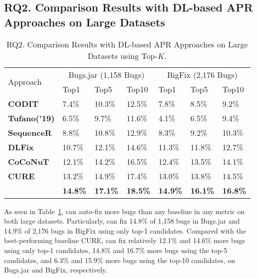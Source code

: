 \subsection{\bf RQ2. Comparison Results with DL-based APR Approaches on Large Datasets}

\begin{table}[t]
	\caption{RQ2. Comparison Results with DL-based APR Approaches on Large Datasets using Top-$K$.}
	\vspace{-10pt}
        {\small
	\begin{center}
		\renewcommand{\arraystretch}{1}
		\begin{tabular}{p{1.6cm}|p{0.7cm}|p{0.7cm}|p{0.7cm}|p{0.7cm}|p{0.7cm}|p{0.7cm}}\hline
			\multirow{2}{*}{Approach}&\multicolumn{3}{c|}{Bugs.jar (1,158 Bugs)}&\multicolumn{3}{c}{BigFix (2,176 Bugs)}\\\cline{2-7}
		                          & Top1   & Top5   & Top10  & Top1   & Top5   & Top10\\
			\hline
			\textbf{CODIT}        & 7.4\%  & 10.3\% & 12.5\% & 7.8\%  & 8.5\%  & 9.2\%\\
			\textbf{Tufano('19)}  & 6.5\%  & 9.7\%  & 11.6\% & 4.1\%  & 6.5\%  & 9.4\%\\
			\textbf{SequenceR}    & 8.8\%  & 10.8\% & 12.9\% & 8.3\%  & 9.2\%  & 10.3\%\\
			\textbf{DLFix}        & 10.7\% & 12.1\% & 14.6\% & 11.3\% & 11.8\% & 12.7\%\\
			\textbf{CoCoNuT}      & 12.1\% & 14.2\% & 16.5\% & 12.4\% & 13.5\% & 14.1\%\\
			\textbf{CURE}         & 13.2\% & 14.9\% & 17.4\% & 13.0\% & 13.8\% & 14.5\%\\
			\hline
			\textbf{\tool}        & \textbf{14.8\%} & \textbf{17.1\%} & \textbf{18.5\%} & \textbf{14.9\%} & \textbf{16.1\%} & \textbf{16.8\%}\\
			\hline
		\end{tabular}
		\label{RQ2_results}
	\end{center}
        }
\end{table}


As seen in Table~\ref{RQ2_results}, {\tool} can auto-fix more bugs
than any baseline in any metric on both large datasets.  Particularly,
{\tool} can fix 14.8\% of 1,158 bugs in Bugs.jar and 14.9\% of 2,176
bugs in BigFix using only top-1 candidates. Compared with the
best-performing baseline CURE, {\tool} can fix relatively 12.1\% and
14.6\% more bugs using only top-1 candidates, 14.8\% and 16.7\% more
bugs using the top-5 candidates, and 6.3\% and 15.9\% more bugs using
the top-10 candidates, on Bugs.jar and BigFix, respectively.
